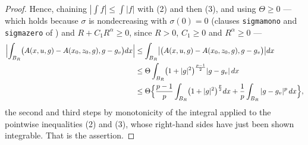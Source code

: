 \begin{proof}
Hence, chaining $|\int f|\le\int|f|$ with (2) and then (3), and using
$\Theta\ge0$ --- which holds because $\sigma$ is nondecreasing with
$\sigma(0)=0$ (clauses \texttt{sigmamono} and \texttt{sigmazero} of
) and $R+C_1R^{\alpha}\ge0$, since $R>0$,
$C_1\ge0$ and $R^{\alpha}\ge0$ ---
\begin{align*}
\Bigl|\int_{B_R}\bigl(A(x,u,g)-A(x_0,z_0,g),g-g_v\bigr)dx\Bigr|
&\le\int_{B_R}\bigl|\bigl(A(x,u,g)-A(x_0,z_0,g),g-g_v\bigr)\bigr|dx\\
&\le\Theta\int_{B_R}\bigl(1+|g|^2\bigr)^{\frac{p-1}2}|g-g_v|\,dx\\
&\le\Theta\Bigl\{\frac{p-1}p\int_{B_R}\bigl(1+|g|^2\bigr)^{\frac p2}dx
+\frac1p\int_{B_R}|g-g_v|^p\,dx\Bigr\},
\end{align*}
the second and third steps by monotonicity of the integral applied to the
pointwise inequalities (2) and (3), whose right-hand sides have just been shown
integrable.  That is the assertion.
\end{proof}
